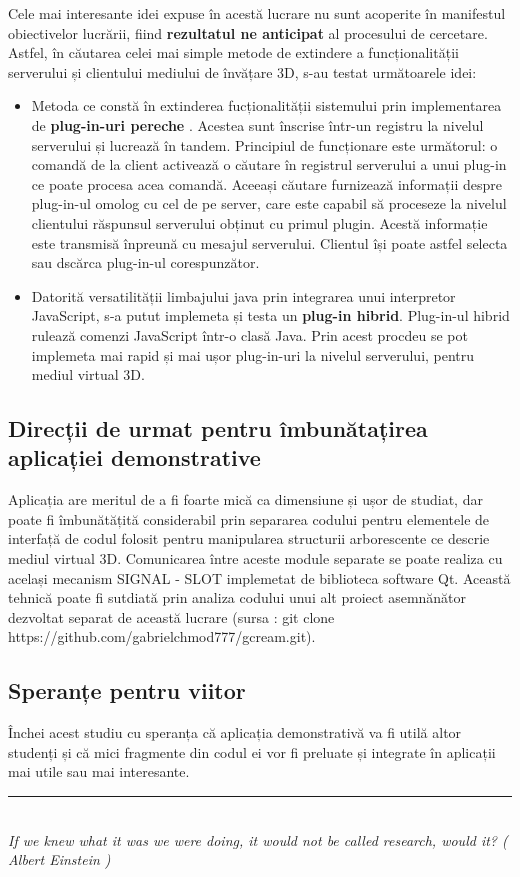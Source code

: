 \par Cele mai interesante idei expuse în acestă lucrare nu sunt acoperite în manifestul obiectivelor lucrării, fiind \textbf{rezultatul ne anticipat} al procesului de cercetare. Astfel, în căutarea celei mai simple metode de extindere a funcționalității serverului și clientului mediului de învățare 3D, s-au testat următoarele idei:
\begin{itemize}
\item  Metoda ce constă în extinderea fucționalității sistemului prin implementarea de \textbf{ plug-in-uri pereche }. Acestea sunt înscrise într-un registru la nivelul serverului și lucrează în tandem. Principiul de funcționare este următorul: o comandă de la client activează o căutare în registrul serverului a unui plug-in ce poate procesa acea comandă. Aceeași căutare furnizează informații despre plug-in-ul omolog cu cel de pe server, care este capabil să proceseze la nivelul clientului răspunsul serverului obținut cu primul plugin. Acestă informație este transmisă înpreună cu mesajul serverului. Clientul își poate astfel selecta sau dscărca plug-in-ul corespunzător.
\item Datorită versatilității limbajului java prin integrarea unui interpretor JavaScript, s-a putut implemeta și testa un \textbf{plug-in hibrid}. Plug-in-ul hibrid rulează comenzi JavaScript într-o clasă Java. Prin acest procdeu se pot implemeta mai rapid și mai ușor plug-in-uri la nivelul serverului, pentru mediul virtual 3D.
\end{itemize}
\subsection{Direcții de urmat pentru îmbunătațirea aplicației demonstrative}

\par Aplicația are meritul de a fi foarte mică ca dimensiune și ușor de studiat, dar poate fi îmbunătățită considerabil prin separarea codului pentru elementele de interfață de codul folosit pentru manipularea structurii arborescente ce descrie mediul virtual 3D. Comunicarea între aceste module separate se poate realiza cu același mecanism SIGNAL - SLOT implemetat de biblioteca software Qt. Această tehnică poate fi sutdiată prin analiza codului unui alt proiect asemnănător dezvoltat separat de această lucrare (sursa : git clone https://github.com/gabrielchmod777/gcream.git).

\subsection{Speranțe pentru viitor}
\par Închei acest studiu cu speranța că aplicația demonstrativă va fi utilă altor studenți și că mici fragmente din codul ei vor fi preluate și integrate în aplicații mai utile sau mai interesante.

\rule{\textwidth}{1pt}
\\
\textit{ If we knew what it was we were doing, it would not be called research, would it? ( Albert Einstein ) }